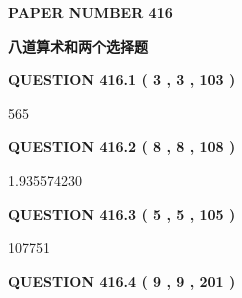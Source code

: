 \documentclass{ctexart}
\begin{document}
 
 
 
 
   
   
\newpage 
\setcounter{page}{ 
   416001 } 
   
   
   
   
 {\textbf{ \Large{ PAPER NUMBER  416  }}}
   
   
\vspace{0.2in}
   
   
   
   
   
   
 \vspace{0.2in}
{\LARGE {\textbf{ 八道算术和两个选择题}}}
   
   
  
\vspace{0.2in}
  
{\textbf{\Large{QUESTION
416.1 
 ( 3 , 3 , 103 )
}}}
  
  
 
 
\noindent{}

565
 
 
  
\vspace{0.2in}
  
{\textbf{\Large{QUESTION
416.2 
 ( 8 , 8 , 108 )
}}}
  
  
 
 
\noindent{}

1.935574230
 
 
  
\vspace{0.2in}
  
{\textbf{\Large{QUESTION
416.3 
 ( 5 , 5 , 105 )
}}}
  
  
 
 
\noindent{}

107751
 
 
  
\vspace{0.2in}
  
{\textbf{\Large{QUESTION
416.4 
 ( 9 , 9 , 201 )
}}}
  
  
 
 
\noindent{}
 
\end{document}
